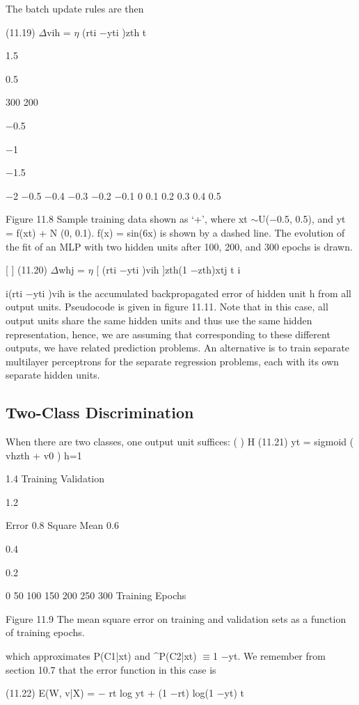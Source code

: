 The batch update rules are then

(11.19) $\Delta$vih = $\eta$ (rti $-$yti )zth t

1.5

0.5

300 200

$-$0.5

$-$1

$-$1.5

$-$2 $-$0.5 $-$0.4 $-$0.3 $-$0.2 $-$0.1 0 0.1 0.2 0.3 0.4 0.5

Figure 11.8 Sample training data shown as ‘+’, where xt $\sim$U($-$0.5, 0.5), and yt = f(xt) + N (0, 0.1). f(x) = sin(6x) is shown by a dashed line. The evolution of the fit of an MLP with two hidden units after 100, 200, and 300 epochs is drawn.

[ ] (11.20) $\Delta$whj = $\eta$ [ (rti $-$yti )vih ]zth(1 $-$zth)xtj t i

i(rti $-$yti )vih is the accumulated backpropagated error of hidden unit h from all output units. Pseudocode is given in figure 11.11. Note that in this case, all output units share the same hidden units and thus use the same hidden representation, hence, we are assuming that corresponding to these different outputs, we have related prediction problems. An alternative is to train separate multilayer perceptrons for the separate regression problems, each with its own separate hidden units.

\subsection{Two-Class Discrimination}

When there are two classes, one output unit suffices: ( ) H (11.21) yt = sigmoid ( vhzth + v0 ) h=1

1.4 Training Validation

1.2

Error 0.8 Square Mean 0.6

0.4

0.2

0 50 100 150 200 250 300 Training Epochs

Figure 11.9 The mean square error on training and validation sets as a function of training epochs.

which approximates P(C1|xt) and \textasciicircum{}P(C2|xt) $\equiv$1 $-$yt. We remember from section 10.7 that the error function in this case is

(11.22) E(W, v|X) = $-$ rt log yt + (1 $-$rt) log(1 $-$yt) t

